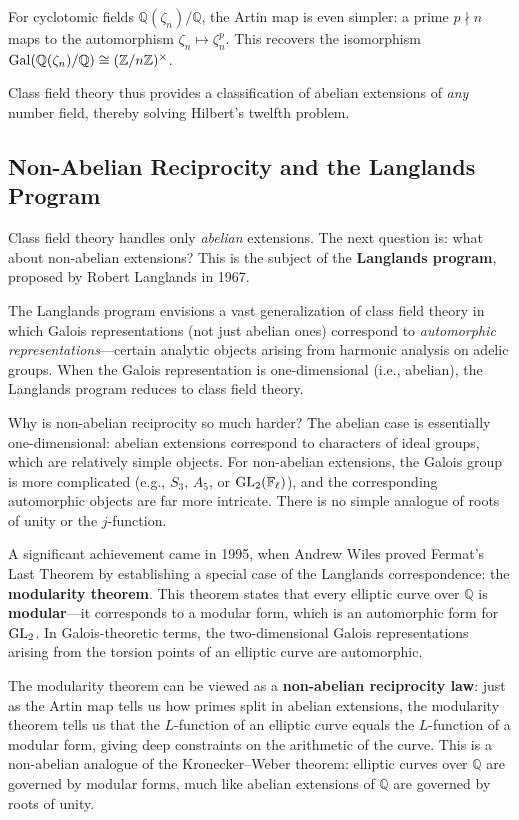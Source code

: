For cyclotomic fields $\mathbb{Q}(\zeta_n)/\mathbb{Q}$, the Artin map is even simpler: a prime $p \nmid n$ maps to the automorphism $\zeta_n \mapsto \zeta_n^p$. This recovers the isomorphism $\operatorname{Gal}(\mathbb{Q}(\zeta_n)/\mathbb{Q}) \cong (\mathbb{Z}/n\mathbb{Z})^\times$.

Class field theory thus provides a classification of abelian extensions of \emph{any} number field, thereby solving Hilbert's twelfth problem.

\subsection{Non-Abelian Reciprocity and the Langlands Program}

Class field theory handles only \emph{abelian} extensions. The next question is: what about non-abelian extensions? This is the subject of the \textbf{Langlands program}, proposed by Robert Langlands in 1967.

The Langlands program envisions a vast generalization of class field theory in which Galois representations (not just abelian ones) correspond to \emph{automorphic representations}---certain analytic objects arising from harmonic analysis on adelic groups. When the Galois representation is one-dimensional (i.e., abelian), the Langlands program reduces to class field theory.

Why is non-abelian reciprocity so much harder? The abelian case is essentially one-dimensional: abelian extensions correspond to characters of ideal groups, which are relatively simple objects. For non-abelian extensions, the Galois group is more complicated (e.g., $S_3$, $A_5$, or $\operatorname{GL}_2(\mathbb{F}_\ell)$), and the corresponding automorphic objects are far more intricate. There is no simple analogue of roots of unity or the $j$-function.

A significant achievement came in 1995, when Andrew Wiles proved Fermat's Last Theorem by establishing a special case of the Langlands correspondence: the \textbf{modularity theorem}. This theorem states that every elliptic curve over $\mathbb{Q}$ is \textbf{modular}---it corresponds to a modular form, which is an automorphic form for $\operatorname{GL}_2$. In Galois-theoretic terms, the two-dimensional Galois representations arising from the torsion points of an elliptic curve are automorphic.

The modularity theorem can be viewed as a \textbf{non-abelian reciprocity law}: just as the Artin map tells us how primes split in abelian extensions, the modularity theorem tells us that the $L$-function of an elliptic curve equals the $L$-function of a modular form, giving deep constraints on the arithmetic of the curve. This is a non-abelian analogue of the Kronecker--Weber theorem: elliptic curves over $\mathbb{Q}$ are governed by modular forms, much like abelian extensions of $\mathbb{Q}$ are governed by roots of unity.

